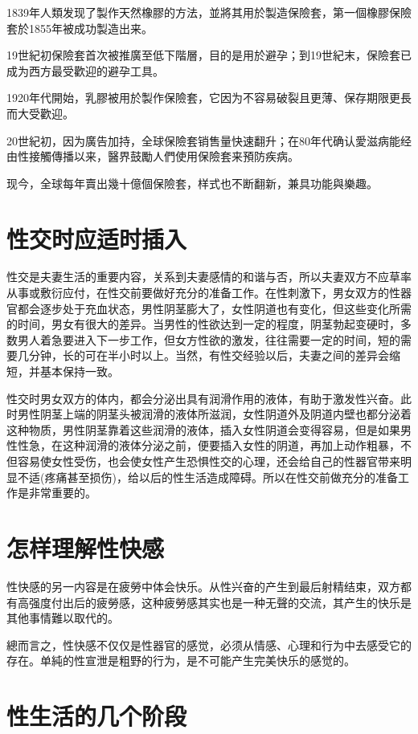 \documentclass[12pt,UTF8]{ctexbook}
\begin{document}
1839年人類发现了製作天然橡膠的方法，並將其用於製造保險套，第一個橡膠保險套於1855年被成功製造出来。

19世紀初保險套首次被推廣至低下階層，目的是用於避孕；到19世紀末，保險套已成为西方最受歡迎的避孕工具。

1920年代開始，乳膠被用於製作保險套，它因为不容易破裂且更薄、保存期限更長而大受歡迎。

20世紀初，因为廣告加持，全球保險套销售量快速翻升；在80年代确认愛滋病能经由性接觸傳播以来，醫界鼓勵人們使用保險套来預防疾病。

现今，全球每年賣出幾十億個保險套，样式也不断翻新，兼具功能與樂趣。



\section{性交时应适时插入}

性交是夫妻生活的重要内容，关系到夫妻感情的和谐与否，所以夫妻双方不应草率从事或敷衍应付，在性交前要做好充分的准备工作。在性刺激下，男女双方的性器官都会逐步处于充血状态，男性阴茎膨大了，女性阴道也有变化，但这些变化所需的时间，男女有很大的差异。当男性的性欲达到一定的程度，阴茎勃起变硬时，多数男人着急要进入下一步工作，但女方性欲的激发，往往需要一定的时间，短的需要几分钟，长的可在半小时以上。当然，有性交经验以后，夫妻之间的差异会缩短，并基本保持一致。

性交时男女双方的体内，都会分泌出具有润滑作用的液体，有助于激发性兴奋。此时男性阴茎上端的阴茎头被润滑的液体所滋润，女性阴道外及阴道内壁也都分泌着这种物质，男性阴茎靠着这些润滑的液体，插入女性阴道会变得容易，但是如果男性性急，在这种润滑的液体分泌之前，便要插入女性的阴道，再加上动作粗暴，不但容易使女性受伤，也会使女性产生恐惧性交的心理，还会给自己的性器官带来明显不适(疼痛甚至损伤)，给以后的性生活造成障碍。所以在性交前做充分的准备工作是非常重要的。

\section{怎样理解性快感}

性快感的另一内容是在疲勞中体会快乐。从性兴奋的产生到最后射精结束，双方都有高强度付出后的疲勞感，这种疲勞感其实也是一种无聲的交流，其产生的快乐是其他事情難以取代的。

總而言之，性快感不仅仅是性器官的感觉，必须从情感、心理和行为中去感受它的存在。单純的性宣泄是粗野的行为，是不可能产生完美快乐的感觉的。

\section{性生活的几个阶段}
\end{document}
